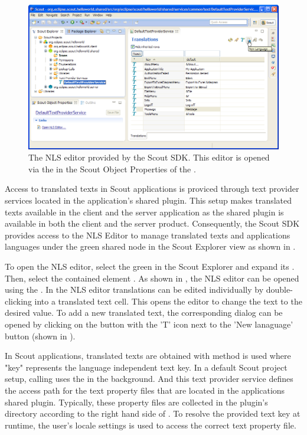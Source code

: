 \documentclass[a4paper,10pt,twoside]{book}
\begin{document}
\begin{figure}
\includegraphics[width=14cm]{sdk_nls_editor.png} 
\caption{The NLS editor provided by the Scout SDK. This editor is opened via the  in the Scout Object Properties of the .
}
\end{figure}

Access to translated texts in Scout applications is proviced through text provider services located in the application's shared plugin. 
This setup makes translated texts available in the client and the server application as the shared plugin is available in both the client and the server product. 
Consequently, the Scout SDK provides access to the NLS Editor to manage translated texts and applications languages under the green shared node in the Scout Explorer view as shown in .

To open the NLS editor, select the green  in the Scout Explorer and expand its .
Then, select the contained element .
As shown in , the NLS editor can be opened using the .
In the NLS editor translations can be edited individually by double-clicking into a translated text cell.
This opens the editor to change the text to the desired value.
To add a new translated text, the corresponding dialog can be opened by clicking on the button with the 'T' icon next to the 'New lanaguage' button (shown in ).

In Scout applications, translated texts are obtained with method  is used where "key" represents the language independent text key.
In a default Scout project setup, calling  uses the  in the background.
And this text provider service defines the access path for the text property files that are located in the applications shared plugin.
Typically, these property files are collected in the plugin's  directory according to the right hand side of . 
To resolve the provided text key at runtime, the user's locale settings is used to access the correct text property file.
\end{document}
